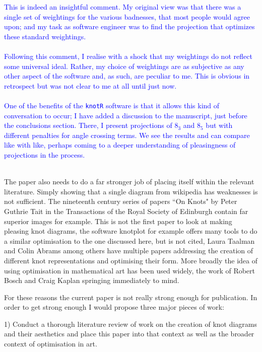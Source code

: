 \documentclass[12pt]{article}
\begin{document}
\textcolor{blue}{This is indeed an insightful comment.  My original
  view was that there was a single set of weightings for the various
  badnesses, that most people would agree upon; and my task as
  software engineer was to find the projection that optimizes these
  standard weightings.\\ \\ Following this comment, I realise with a
  shock that my weightings do not reflect some universal ideal.
  Rather, my choice of weightings are as subjective as any other
  aspect of the software and, as such, are peculiar to me.  This is
  obvious in retrospect but was not clear to me at all until just
  now.\\ \\ One of the benefits of the {\tt knotR} software is that it
  allows this kind of conversation to occur; I have added a discussion
  to the manuscript, just before the conclusions section.  There, I
  present projections of $8_3$ and $8_5$ but with different penalties
  for angle crossing terms.  We see the results and can compare like
  with like, perhaps coming to a deeper understanding of pleasingness
  of projections in the process.\\ \\}

The paper also needs to do a far stronger job of placing itself within
the relevant literature. Simply showing that a single diagram from
wikipedia has weaknesses is not sufficient. The nineteenth century
series of papers ``On Knots" by Peter Guthrie Tait in the Transactions
of the Royal Society of Edinburgh contain far superior images for
example. This is not the first paper to look at making pleasing knot
diagrams, the software knotplot for example offers many tools to do a
similar optimisation to the one discussed here, but is not cited,
Laura Taalman and Colin Abrams among others have multiple papers
addressing the creation of different knot representations and
optimising their form. More broadly the idea of using optimisation in
mathematical art has been used widely, the work of Robert Bosch and
Craig Kaplan springing immediately to mind.

For these reasons the current paper is not really strong enough for
publication. In order to get strong enough I would propose three major
pieces of work:

1) Conduct a thorough literature review of work on the creation of
knot diagrams and their aesthetics and place this paper into that
context as well as the broader context of optimisation in art. %
\end{document}
